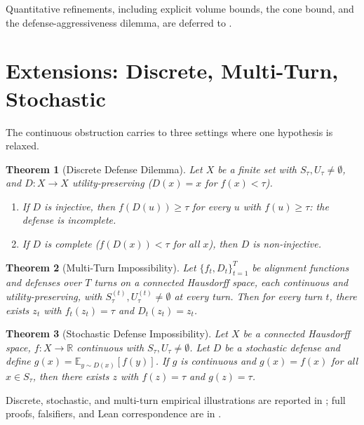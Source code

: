 \documentclass[11pt]{article}
\newtheorem{theorem}{Theorem}[section]
\newcommand{\R}{\mathbb{R}}
\begin{document}
Quantitative refinements, including explicit volume bounds, the cone
bound, and the defense-aggressiveness dilemma, are deferred to
.


\section{Extensions: Discrete, Multi-Turn, Stochastic}
\label{sec:extensions}
\label{sec:bridge}

The continuous obstruction carries to three settings where one
hypothesis is relaxed.

\begin{theorem}[Discrete Defense Dilemma]
\label{thm:disc-dilemma}
Let $X$ be a finite set with $S_\tau, U_\tau \neq \emptyset$, and
$D\colon X \to X$ utility-preserving ($D(x) = x$ for $f(x) < \tau$).
\begin{enumerate}[nosep]
  \item If $D$ is injective, then $f(D(u)) \geq \tau$ for every
    $u$ with $f(u) \geq \tau$: the defense is incomplete.
  \item If $D$ is complete ($f(D(x)) < \tau$ for all $x$), then $D$ is
    non-injective.
\end{enumerate}
\end{theorem}

\begin{theorem}[Multi-Turn Impossibility]
\label{thm:multi-turn}
Let $\{f_t, D_t\}_{t=1}^T$ be alignment functions and defenses over
$T$ turns on a connected Hausdorff space, each continuous and
utility-preserving, with $S_\tau^{(t)}, U_\tau^{(t)} \neq \emptyset$
at every turn. Then for every turn $t$, there exists $z_t$ with
$f_t(z_t) = \tau$ and $D_t(z_t) = z_t$.
\end{theorem}

\begin{theorem}[Stochastic Defense Impossibility]
\label{thm:stochastic}
Let $X$ be a connected Hausdorff space, $f\colon X \to \R$ continuous
with $S_\tau, U_\tau \neq \emptyset$. Let $D$ be a stochastic defense
and define $g(x) = \mathbb{E}_{y \sim D(x)}[f(y)]$. If $g$ is
continuous and $g(x) = f(x)$ for all $x \in S_\tau$, then there
exists $z$ with $f(z) = \tau$ and $g(z) = \tau$.
\end{theorem}

Discrete, stochastic, and multi-turn empirical illustrations are
reported in
;
full proofs, falsifiers, and Lean correspondence are in
.
\end{document}

